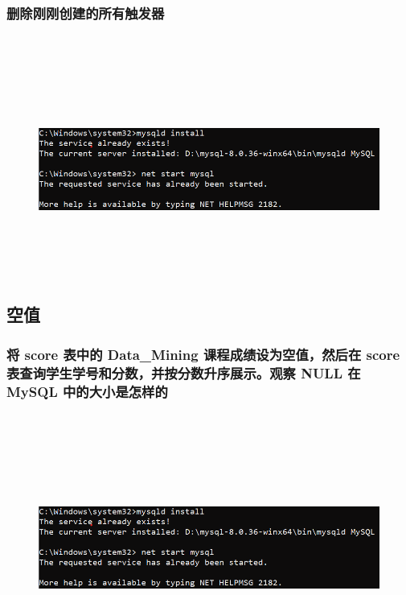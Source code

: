 \documentclass{ctexart}
\begin{document}
\subsubsection{删除刚刚创建的所有触发器}
\begin{lstlisting}[language=sql]
	
\end{lstlisting}
\begin{figure}[H]
	\centering 
	\includegraphics[height=7cm,width=14cm]{1.png}
	\end{figure}
\subsection{空值}
\subsubsection{将 score 表中的 Data\_Mining 课程成绩设为空值，然后在 score 表查询学生学号和分数，并按分数升序展示。观察 NULL 在 MySQL 中的大小是怎样的}
\begin{lstlisting}[language=sql]
	
\end{lstlisting}
\begin{figure}[H]
	\centering 
	\includegraphics[height=7cm,width=14cm]{1.png}
	\end{figure}
\end{document}
